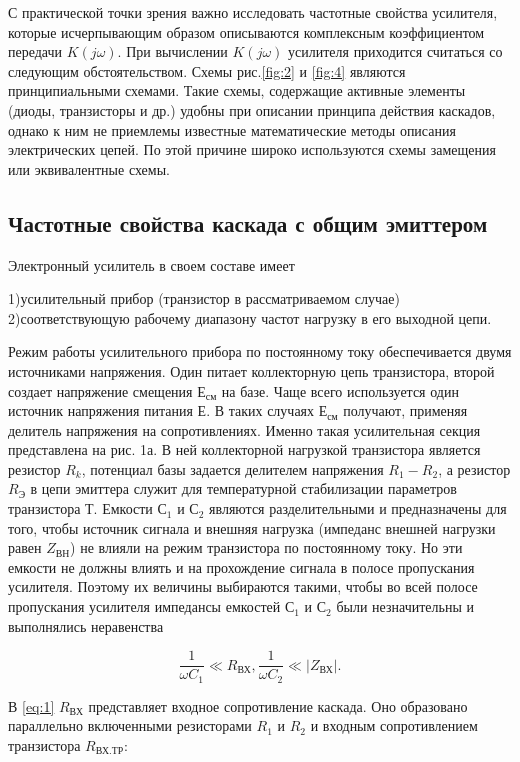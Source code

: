 С практической точки зрения важно исследовать частотные свойства усилителя, которые исчерпывающим образом описываются комплексным коэффициентом передачи $K(j\omega)$. При вычислении $K(j\omega)$ усилителя приходится считаться со следующим обстоятельством. Схемы рис.\ref{fig:2} и \ref{fig:4} являются принципиальными схемами. Такие схемы, содержащие активные элементы (диоды, транзисторы и др.) удобны при описании принципа действия каскадов, однако к ним не приемлемы известные математические методы описания электрических цепей. По этой причине широко используются схемы замещения или эквивалентные схемы.

\subsection{\textbf{Частотные свойства каскада с общим эмиттером}}
Электронный усилитель в своем составе имеет 

1)усилительный прибор (транзистор в рассматриваемом случае)
2)соответствующую рабочему диапазону частот нагрузку в его
выходной цепи.

Режим работы усилительного прибора по постоянному току обеспечивается двумя источниками напряжения. Один питает коллекторную цепь транзистора, второй создает
напряжение смещения $Е_{\text{см}}$ на базе. Чаще всего используется один источник напряжения питания Е. В таких случаях $Е_{\text{см}}$ получают, применяя делитель напряжения на сопротивлениях. Именно такая усилительная секция представлена на рис. 1а. В ней коллекторной нагрузкой транзистора является резистор $R_k$, потенциал базы
задается делителем напряжения $R_1-R_2$, а резистор $R_{\text{Э}}$ в цепи эмиттера служит для температурной стабилизации параметров транзистора Т. Емкости $С_1$ и $С_2$ являются разделительными и предназначены для того, чтобы источник сигнала и внешняя нагрузка (импеданс внешней нагрузки равен $Z_{ВН}$) не влияли на режим транзистора по постоянному току. Но эти емкости не должны влиять и на прохождение сигнала в полосе пропускания усилителя. Поэтому их величины выбираются такими, чтобы во всей полосе пропускания усилителя импедансы емкостей $С_1$ и $С_2$ были незначительны и выполнялись неравенства

\begin{equation}
	\frac{1}{\omega C_1}\ll R_{\text{ВХ}}, \frac{1}{\omega C_2}\ll |Z_{\text{ВХ}}|.
	\label{eq:1}
\end{equation}

В \ref{eq:1} $R_{\text{ВХ}}$ представляет входное сопротивление каскада. Оно образовано параллельно включенными резисторами $R_1$ и $R_2$ и входным  сопротивлением транзистора $R_{\text{ВХ.ТР}}$:

